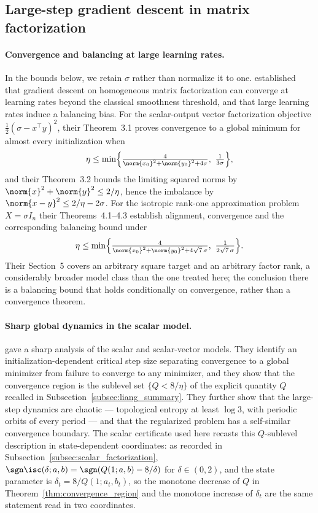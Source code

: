 \documentclass{article}
\begin{document}
\subsection{Large-step gradient descent in matrix factorization}
\label{subsec:rw_large_step}

\paragraph{Convergence and balancing at large learning rates.}
In the bounds below, we retain $\sigma$ rather than normalize it to one.
\citet{wang2022large} established that gradient descent on homogeneous matrix
factorization can converge at learning rates beyond the classical smoothness
threshold, and that large learning rates induce a balancing bias. For the
scalar-output vector factorization objective $\tfrac12(\sigma-x^\top y)^2$, their
Theorem~3.1 proves convergence to a global minimum for almost every
initialization when
\begin{align}
    \eta\le\min\Bigl\{\tfrac{4}{\norm{x_0}^2+\norm{y_0}^2+4\sigma},\ \tfrac{1}{3\sigma}\Bigr\},
\end{align}
and their Theorem~3.2 bounds the limiting squared norms by
$\norm{x}^2+\norm{y}^2\le 2/\eta$, hence the imbalance by
$\norm{x-y}^2\le 2/\eta-2\sigma$. For the isotropic rank-one approximation problem
$X=\sigma I_n$ their Theorems~4.1--4.3 establish alignment, convergence and the
corresponding balancing bound under
\begin{align}
    \eta\le\min\Bigl\{\tfrac{4}{\norm{x_0}^2+\norm{y_0}^2+4\sqrt7\,\sigma},\
    \tfrac{1}{2\sqrt7\,\sigma}\Bigr\}.
\end{align}
Their Section~5 covers an arbitrary square target and an arbitrary factor rank,
a considerably broader model class than the one treated here; the conclusion
there is a balancing bound that holds conditionally on convergence, rather than
a convergence theorem.

\paragraph{Sharp global dynamics in the scalar model.}
\citet{liang2025gradient} gave a sharp analysis of the scalar and scalar-vector
models. They identify an initialization-dependent critical step size separating
convergence to a global minimizer from failure to converge to any minimizer, and
they show that the convergence region is the sublevel set $\{Q<8/\eta\}$ of the
explicit quantity $Q$ recalled in Subsection~\ref{subsec:liang_summary}. They further show that the large-step dynamics are chaotic --- topological
entropy at least $\log3$, with periodic orbits of every period --- and that the
regularized problem has a self-similar convergence boundary. The scalar
certificate used here recasts this $Q$-sublevel description in state-dependent
coordinates: as recorded in Subsection~\ref{subsec:scalar_factorization},
$\sgn\isc(\delta;a,b)=\sgn(Q(1;a,b)-8/\delta)$ for $\delta\in(0,2)$, and the
state parameter is
$\delta_t=8/Q(1;a_t,b_t)$, so the monotone decrease of $Q$ in
Theorem~\ref{thm:convergence_region} and the monotone increase of $\delta_t$ are
the same statement read in two coordinates.
\end{document}
